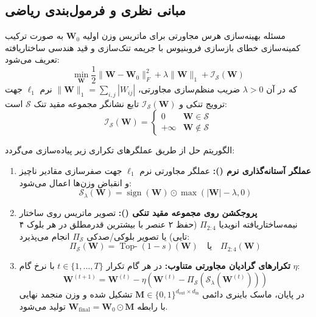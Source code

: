 \subsection{مبانی نظری و فرمول‌بندی ریاضی}
مسئله بهینه‌سازی هرس مجاورتی برای ماتریس وزن اولیه $\mathbf{W}_0$ به صورت ترکیب کمینه‌سازی خطای بازسازی فروبنیوس با جریمه تنک‌سازی و قید هندسی ساختاریافته تعریف می‌شود:
\begin{equation}
\min_{\mathbf{W}} \frac{1}{2} \|\mathbf{W} - \mathbf{W}_0\|_F^2 + \lambda \|\mathbf{W}\|_1 + \mathcal{I}_{\mathcal{S}}(\mathbf{W})
\end{equation}
که در آن $\lambda > 0$ ضریب منظم‌سازی مجاورتی، $\|\mathbf{W}\|_1 = \sum_{i,j} |W_{ij}|$ نرم $\ell_1$ جهت ترویج تنکی و $\mathcal{I}_{\mathcal{S}}(\mathbf{W})$ تابع نشانگر مجموعه مقید تنک $\mathcal{S}$ است:
\begin{equation}
\mathcal{I}_{\mathcal{S}}(\mathbf{W}) = \begin{cases} 0 & \mathbf{W} \in \mathcal{S} \\ +\infty & \mathbf{W} \notin \mathcal{S} \end{cases}
\end{equation}

الگوریتم حل از طریق عملگرهای تکراری زیر پیاده‌سازی می‌گردد:
\begin{enumerate}
    \item \textbf{عملگر آستانه‌گذاری نرم ():}
    عملگر مجاورتی نرم $\ell_1$ جهت صفرسازی مقادیر ناچیز و انقباض وزن‌ها اعمال می‌شود:
    \begin{equation}
    \mathcal{S}_{\lambda}(\mathbf{W}) = \operatorname{sign}(\mathbf{W}) \odot \max(|\mathbf{W}| - \lambda, 0)
    \end{equation}

    \item \textbf{پروجکشن روی مجموعه مقید تنکی ():}
    تصویر ماتریس روی ساختار نیمه‌ساختاریافته انویدیا $\Pi_{2:4}$ (حفظ ۲ عنصر با بیشترین قدرمطلق در هر بلوک ۴ تایی) یا تصویر بلوکی/صدکی $\Pi_{\mathcal{S}}$ انجام می‌پذیرد:
    \begin{equation}
    \Pi_{\mathcal{S}}(\mathbf{W}) = \operatorname{Top-}(1-s)(\mathbf{W}) \quad \text{یا} \quad \Pi_{2:4}(\mathbf{W})
    \end{equation}

    \item \textbf{تکرارهای گرادیان مجاورتی متناوب:}
    در هر گام تکرار $t \in \{1, \dots, T\}$ با نرخ گام $\eta$:
    \begin{equation}
    \mathbf{W}^{(t+1)} = \mathbf{W}^{(t)} - \eta \left( \mathbf{W}^{(t)} - \Pi_{\mathcal{S}}(\mathcal{S}_{\lambda}(\mathbf{W}^{(t)})) \right)
    \end{equation}
    در پایان، ماسک باینری دائمی $\mathbf{M} \in \{0, 1\}^{d_{\text{out}} \times d_{\text{in}}}$ تشکیل شده و وزن منجمد نهایی با رابطه $\mathbf{W}_{\text{final}} = \mathbf{W}_0 \odot \mathbf{M}$ تولید می‌شود.
\end{enumerate}


